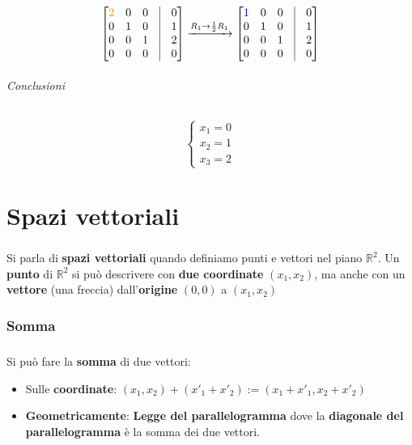 \documentclass[a4paper, 12pt]{report}
\begin{document}
                    $$
                    \begin{bmatrix}
                        \textcolor{orange}{2} & 0 & 0 & \vline & 0\\
                        0 & 1 & 0 & \vline & 1\\
                        0 & 0 & 1 & \vline & 2\\
                        0 & 0 & 0 & \vline & 0
                    \end{bmatrix}
                    \xrightarrow[]{R_1\rightarrow \frac{1}{2}R_1}
                    \begin{bmatrix}
                        \textcolor{blue}{1} & 0 & 0 & \vline & 0\\
                        0 & 1 & 0 & \vline & 1\\
                        0 & 0 & 1 & \vline & 2\\
                        0 & 0 & 0 & \vline & 0
                    \end{bmatrix}
                    $$
                \subparagraph{Conclusioni}
                $$
                \begin{cases}
                x_1=0\\
                x_2=1\\
                x_3=2  
                \end{cases}
                $$
    \chapter{Spazi vettoriali}
        \paragraph{}Si parla di \textbf{spazi vettoriali} quando definiamo punti e vettori
        nel piano $\mathbb{R}^2$. Un \textbf{punto} di $\mathbb{R}^2$ si può descrivere con \textbf{due coordinate}
        $(x_1,x_2)$, ma anche con un \textbf{vettore} (una freccia) dall'\textbf{origine} $(0,0)$ a $(x_1,x_2)$ 
            \subsection{Somma}
            \paragraph{}Si può fare la \textbf{somma} di due vettori:
                \begin{itemize}
                    \item Sulle \textbf{coordinate}: $(x_1,x_2)+(x'_1+x'_2):=(x_1+x'_1,x_2+x'_2)$
                    \item \textbf{Geometricamente}: \textbf{Legge del parallelogramma} dove la \textbf{diagonale del parallelogramma} è la somma dei due vettori.
                \end{itemize}
\end{document}
